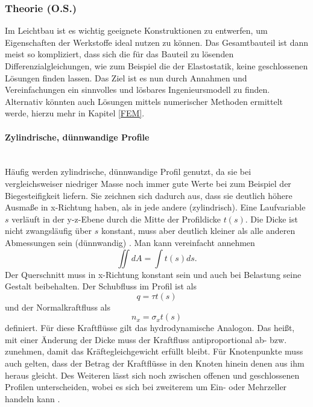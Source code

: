 
\subsubsection{Theorie (O.S.)}
Im Leichtbau ist es wichtig geeignete Konstruktionen zu entwerfen, um Eigenschaften der Werkstoffe ideal nutzen zu können. Das Gesamtbauteil ist dann meist so kompliziert, dass sich die für das Bauteil zu lösenden Differenzialgleichungen, wie zum Beispiel die der Elastostatik, keine geschlossenen Lösungen finden lassen. Das Ziel ist es nun durch Annahmen und Vereinfachungen ein sinnvolles und lösbares Ingenieursmodell zu finden. Alternativ könnten auch Lösungen mittels numerischer Methoden ermittelt werde, hierzu mehr in Kapitel \ref{FEM}.

\paragraph{Zylindrische, dünnwandige Profile}~\\
Häufig werden zylindrische, dünnwandige Profil genutzt, da sie bei vergleichsweiser niedriger Masse noch immer gute Werte bei zum Beispiel der Biegesteifigkeit liefern. Sie zeichnen sich dadurch aus, dass sie deutlich höhere Ausmaße in x-Richtung haben, als in jede andere (zylindrisch). Eine Laufvariable $s$ verläuft in der y-z-Ebene durch die Mitte der Profildicke $t(s)$. Die Dicke ist nicht zwangsläufig über $s$ konstant, muss aber deutlich kleiner als alle anderen Abmessungen sein (dünnwandig) \cite{item15}. Man kann vereinfacht annehmen
\begin{equation}
	\iint dA=\int t(s)ds.
\end{equation} 
Der Querschnitt muss in x-Richtung konstant sein und auch bei Belastung seine Gestalt beibehalten. Der Schubfluss im Profil ist als
\begin{equation}\label{tau}
	q=\tau t(s)
\end{equation}
und der Normalkraftfluss als
\begin{equation}
	n_x=\sigma_x t(s)
\end{equation}
definiert. Für diese Kraftflüsse gilt das hydrodynamische Analogon. Das heißt, mit einer Änderung der Dicke muss der Kraftfluss antiproportional ab- bzw. zunehmen, damit das Kräftegleichgewicht erfüllt bleibt. Für Knotenpunkte muss auch gelten, dass der Betrag der Kraftflüsse in den Knoten hinein denen aus ihm heraus gleicht. Des Weiteren lässt sich noch zwischen offenen und geschlossenen Profilen unterscheiden, wobei es sich bei zweiterem um Ein- oder Mehrzeller handeln kann \cite{item15}.

